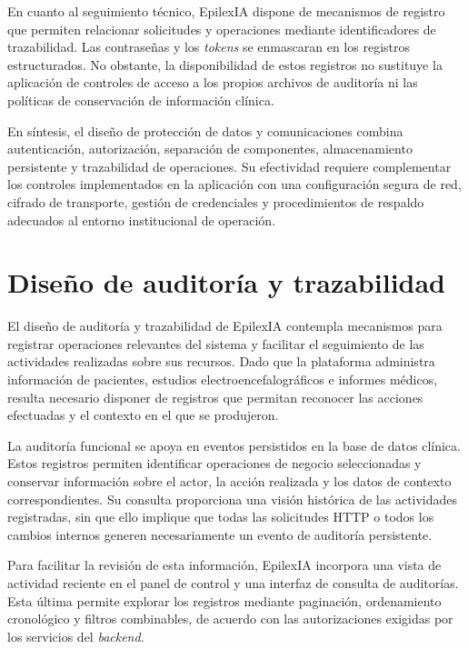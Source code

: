 En cuanto al seguimiento técnico, EpilexIA dispone de mecanismos de registro que permiten relacionar solicitudes y operaciones mediante identificadores de trazabilidad. Las contraseñas y los \textit{tokens} se enmascaran en los registros estructurados. No obstante, la disponibilidad de estos registros no sustituye la aplicación de controles de acceso a los propios archivos de auditoría ni las políticas de conservación de información clínica.

En síntesis, el diseño de protección de datos y comunicaciones combina autenticación, autorización, separación de componentes, almacenamiento persistente y trazabilidad de operaciones. Su efectividad requiere complementar los controles implementados en la aplicación con una configuración segura de red, cifrado de transporte, gestión de credenciales y procedimientos de respaldo adecuados al entorno institucional de operación.

\section{Diseño de auditoría y trazabilidad}
\label{sec:diseno-auditoria-trazabilidad}

El diseño de auditoría y trazabilidad de EpilexIA contempla mecanismos para registrar operaciones relevantes del sistema y facilitar el seguimiento de las actividades realizadas sobre sus recursos. Dado que la plataforma administra información de pacientes, estudios electroencefalográficos e informes médicos, resulta necesario disponer de registros que permitan reconocer las acciones efectuadas y el contexto en el que se produjeron.

La auditoría funcional se apoya en eventos persistidos en la base de datos clínica. Estos registros permiten identificar operaciones de negocio seleccionadas y conservar información sobre el actor, la acción realizada y los datos de contexto correspondientes. Su consulta proporciona una visión histórica de las actividades registradas, sin que ello implique que todas las solicitudes HTTP o todos los cambios internos generen necesariamente un evento de auditoría persistente.

Para facilitar la revisión de esta información, EpilexIA incorpora una vista de actividad reciente en el panel de control y una interfaz de consulta de auditorías. Esta última permite explorar los registros mediante paginación, ordenamiento cronológico y filtros combinables, de acuerdo con las autorizaciones exigidas por los servicios del \textit{backend}.

